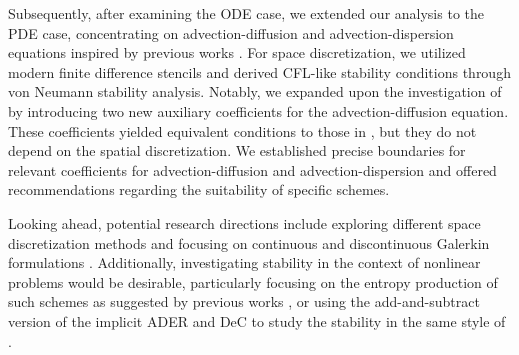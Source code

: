 Subsequently, after examining the ODE case, we extended our analysis to the PDE case, concentrating on advection-diffusion and advection-dispersion equations inspired by previous works \cite{TanChenShu_ImEx_Stability, WangShuZhang_LDG1_2015}. For space discretization, we utilized modern finite difference stencils and derived CFL-like stability conditions through von Neumann stability analysis. 
Notably, we expanded upon the investigation of \cite{TanChenShu_ImEx_Stability} by introducing two new auxiliary coefficients for the advection-diffusion equation. 
These coefficients yielded equivalent conditions to those in \cite{TanChenShu_ImEx_Stability}, but they do not depend on the spatial discretization. 
We established precise boundaries for relevant coefficients for advection-diffusion and advection-dispersion and offered recommendations regarding the suitability of specific schemes.

Looking ahead, potential research directions include exploring different space discretization methods and focusing on continuous and discontinuous Galerkin formulations \cite{ortleb2023stability, zbMATH07137361}. Additionally, investigating stability in the context of nonlinear problems would be desirable, particularly focusing on the entropy production of such schemes as suggested by previous works \cite{zbMATH07086321, zbMATH06928679, oeffner2020}, or
using the add-and-subtract version of the implicit ADER and DeC to study the stability in the same style of \cite{tan2022stability}.